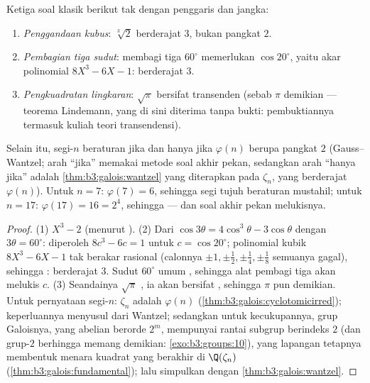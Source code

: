 \begin{corollary}\label{cor:b3:galois:impossible}
Ketiga soal klasik berikut tak  dengan penggaris dan
jangka:
\begin{enumerate}
  \item \emph{Penggandaan kubus}: $\sqrt[3]2$ berderajat
        $3$, bukan pangkat $2$.
  \item \emph{Pembagian tiga sudut}: membagi tiga $60^\circ$
        memerlukan $\cos 20^\circ$, yaitu akar polinomial  $8X^3
        - 6X - 1$: berderajat $3$.
  \item \emph{Pengkuadratan lingkaran}: $\sqrt\pi$ bersifat transenden
        (sebab $\pi$ demikian --- teorema Lindemann, yang di sini diterima tanpa bukti:
        pembuktiannya termasuk kuliah teori transendensi).
\end{enumerate}
Selain itu, segi-$n$ beraturan  jika dan hanya jika
$\varphi(n)$ berupa pangkat $2$ (Gauss--Wantzel; arah ``jika'' memakai
metode soal akhir pekan, sedangkan arah ``hanya jika'' adalah
\cref{thm:b3:galois:wantzel} yang diterapkan pada $\zeta_n$, yang berderajat
$\varphi(n)$). Untuk $n = 7$: $\varphi(7) = 6$, sehingga segi tujuh
beraturan mustahil; untuk $n = 17$: $\varphi(17) = 16 = 2^4$, sehingga
 --- dan soal akhir pekan melukisnya.
\end{corollary}

\begin{proof}
(1) $X^3 - 2$  (menurut ). (2) Dari $\cos
3\theta = 4\cos^3\theta - 3\cos\theta$ dengan $3\theta =
60^\circ$: diperoleh $8c^3 - 6c = 1$ untuk $c = \cos 20^\circ$; polinomial kubik
$8X^3 - 6X - 1$ tak berakar rasional (calonnya $\pm1, \pm\frac
12, \pm\frac14, \pm\frac18$ semuanya gagal), sehingga : berderajat
$3$. Sudut $60^\circ$ umum , sehingga alat pembagi tiga
akan melukis $c$. (3) Seandainya $\sqrt\pi$ , ia
akan bersifat , sehingga $\pi$ pun demikian. Untuk pernyataan segi-$n$:
 $\zeta_n$ adalah $\varphi(n)$
(\cref{thm:b3:galois:cyclotomicirred}); keperluannya menyusul dari
Wantzel; sedangkan untuk kecukupannya, grup Galoisnya, yang abelian berorde
$2^m$, mempunyai rantai subgrup berindeks $2$ (dan grup-$2$ berhingga
memang demikian: \cref{exo:b3:groups:10}), yang lapangan tetapnya membentuk
menara kuadrat yang berakhir di $\Q(\zeta_n)$
(\cref{thm:b3:galois:fundamental}); lalu simpulkan dengan
\cref{thm:b3:galois:wantzel}.
\end{proof}

